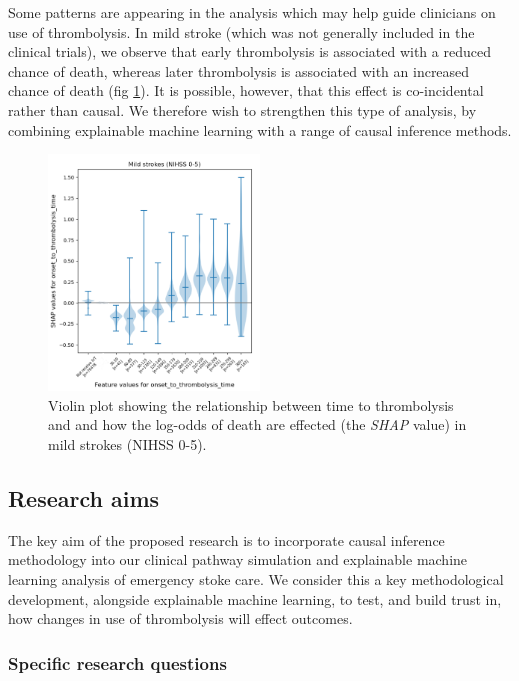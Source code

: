 Some patterns are appearing in the analysis which may help guide clinicians on use of thrombolysis. In mild stroke (which was not generally included in the clinical trials), we observe that early thrombolysis is associated with a reduced chance of death, whereas later thrombolysis is associated with an increased chance of death (fig \ref{fig:death}). It is possible, however, that this effect is co-incidental rather than causal. We therefore wish to strengthen this type of analysis, by combining explainable machine learning with a range of causal inference methods.

\begin{figure}
\centering
\includegraphics[width=0.5\textwidth]{./images/death}
\caption{Violin plot showing the relationship between time to thrombolysis and and how the log-odds of death are effected (the \textit{SHAP} value) in mild strokes (NIHSS 0-5).}
\label{fig:death}
\end{figure}

\subsection{Research aims}

The key aim of the proposed research is to incorporate causal inference methodology into our clinical pathway simulation and explainable machine learning analysis of emergency stoke care. We consider this a key methodological development, alongside explainable machine learning, to test, and build trust in, how changes in use of thrombolysis will effect outcomes.

\subsubsection{Specific research questions}

